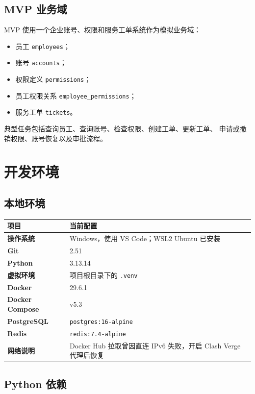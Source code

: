 \documentclass[11pt,a4paper]{ctexart}
\begin{document}
\subsection{MVP 业务域}

MVP 使用一个企业账号、权限和服务工单系统作为模拟业务域：

\begin{itemize}[leftmargin=2em]
  \item 员工 \texttt{employees}；
  \item 账号 \texttt{accounts}；
  \item 权限定义 \texttt{permissions}；
  \item 员工权限关系 \texttt{employee\_permissions}；
  \item 服务工单 \texttt{tickets}。
\end{itemize}

典型任务包括查询员工、查询账号、检查权限、创建工单、更新工单、
申请或撤销权限、账号恢复以及审批流程。

\section{开发环境}

\subsection{本地环境}

\begin{longtable}{>{\bfseries}p{4cm}p{9cm}}
\toprule
项目 & 当前配置 \\
\midrule
操作系统 & Windows，使用 VS Code；WSL2 Ubuntu 已安装 \\
Git & 2.51 \\
Python & 3.13.14 \\
虚拟环境 & 项目根目录下的 \texttt{.venv} \\
Docker & 29.6.1 \\
Docker Compose & v5.3 \\
PostgreSQL & \texttt{postgres:16-alpine} \\
Redis & \texttt{redis:7.4-alpine} \\
网络说明 & Docker Hub 拉取曾因直连 IPv6 失败，开启 Clash Verge 代理后恢复 \\
\bottomrule
\end{longtable}

\subsection{Python 依赖}
\end{document}
